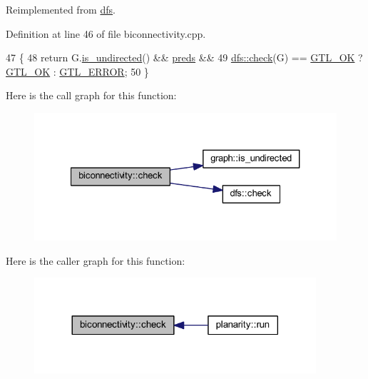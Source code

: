 Reimplemented from \mbox{\hyperlink{classdfs_a1af70060897529e67910f589b047e576}{dfs}}.



Definition at line 46 of file biconnectivity.\+cpp.


\begin{DoxyCode}
47 \{
48     \textcolor{keywordflow}{return} G.\mbox{\hyperlink{classgraph_aba427ff8ba0f70c68416ec1351344cd8}{is\_undirected}}() && \mbox{\hyperlink{classdfs_a3fdeb5a211a1bc1753b2a637258c5355}{preds}} &&
49         \mbox{\hyperlink{classdfs_a1af70060897529e67910f589b047e576}{dfs::check}}(G) == \mbox{\hyperlink{classalgorithm_af1a0078e153aa99c24f9bdf0d97f6710a5114c20e4a96a76b5de9f28bf15e282b}{GTL\_OK}} ? \mbox{\hyperlink{classalgorithm_af1a0078e153aa99c24f9bdf0d97f6710a5114c20e4a96a76b5de9f28bf15e282b}{GTL\_OK}} : \mbox{\hyperlink{classalgorithm_af1a0078e153aa99c24f9bdf0d97f6710a6fcf574690bbd6cf710837a169510dd7}{GTL\_ERROR}};
50 \}
\end{DoxyCode}
Here is the call graph for this function\+:\nopagebreak
\begin{figure}[H]
\begin{center}
\leavevmode
\includegraphics[width=327pt]{classbiconnectivity_a65e0e821f5e9ce8d210648d462fd2cfa_cgraph}
\end{center}
\end{figure}
Here is the caller graph for this function\+:\nopagebreak
\begin{figure}[H]
\begin{center}
\leavevmode
\includegraphics[width=296pt]{classbiconnectivity_a65e0e821f5e9ce8d210648d462fd2cfa_icgraph}
\end{center}
\end{figure}
\mbox{\label{classdfs_aceb066c806cb0beb5688b167a17387c7}} 
